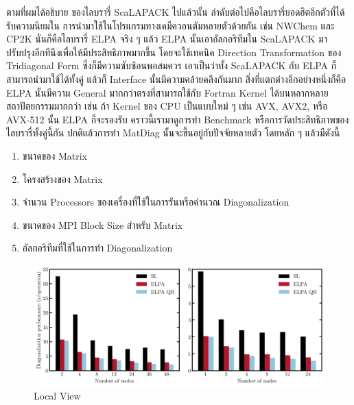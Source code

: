 ตามที่ผมได้อธิบาย  ของไลบรารี่ ScaLAPACK ไปแล้วนั้น ลำดับต่อไปคือไลบรารี่ยอดฮิตอีกตัวที่ได้รับความนิยมใน%
การนำมาใช้ในโปรแกรมทางเคมีควอนตัมหลายตัวด้วยกัน เช่น NWChem และ CP2K นั่นก็คือไลบรารี่ ELPA จริง ๆ แล้ว ELPA นั้นเอาอัลกอริทึมใน
ScaLAPACK มาปรับปรุงอีกทีนึงเพื่อให้มีประสิทธิภาพมากขึ้น โดยจะใช้เทคนิค Direction Transformation ของ Tridiagonal Form
ซึ่งก็มีความซับซ้อนพอสมควร เอาเป็นว่าทั้ง ScaLAPACK กับ ELPA ก็สามารถนำมาใช้ได้ทั้งคู่ แล้วก็ Interface นั้นมีความคล้ายคลึงกันมาก
สิ่งที่แตกต่างอีกอย่างหนึ่งก็คือ ELPA นั้นมีความ General มากกว่าตรงที่สามารถใช้กับ Fortran Kernel ได้บนหลากหลายสถาปัตยกรรมมากกว่า
เช่น ถ้า Kernel ของ CPU เป็นแบบใหม่ ๆ เช่น AVX, AVX2, หรือ AVX-512 นั้น ELPA ก็จะรองรับ คราวนี้เรามาดูการทำ Benchmark
หรือการวัดประสิทธิภาพของไลบรารี่ทั้งคู่นี้กัน ปกติแล้วการทำ MatDiag นั้นจะขึ้นอยู่กับปัจจัยหลายตัว โดยหลัก ๆ แล้วมีดังนี้

\begin{enumerate}[topsep=0pt,noitemsep]
  \setlength\itemsep{0.5em}
  \item ขนาดของ Matrix

  \item โครงสร้างของ Matrix

  \item จำนวน Processors ของเครื่องที่ใช้ในการรันหรือคำนวณ Diagonalization

  \item ขนาดของ MPI Block Size สำหรับ Matrix

  \item อัลกอริทึมที่ใช้ในการทำ Diagonalization
\end{enumerate}

\begin{figure}[htbp]
  \centering
  \includegraphics[width=0.8\linewidth]{fig/diag_perf.png}
  \caption{Local View}
  \label{fig:diag_perf}
\end{figure}

